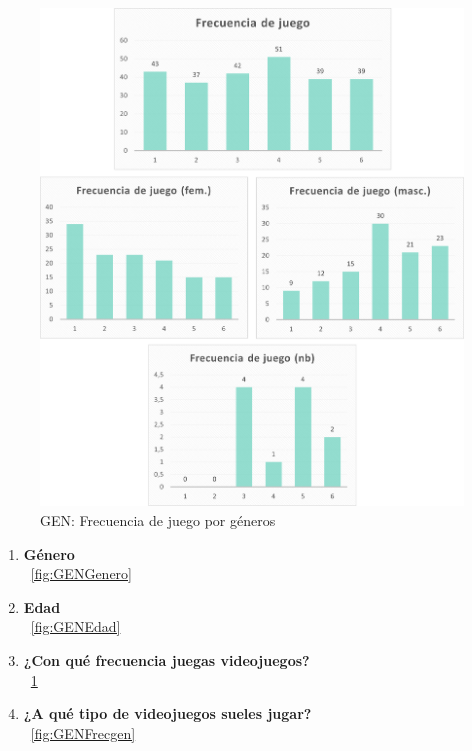 \documentclass[12pt, a4paper,twoside,titlepage]{book}
\begin{document}
\begin{figure}
	\centering
	\includegraphics[width=1\linewidth]{ANEXO Gen/3AnexGENFrecALL}
	\caption{GEN: Frecuencia de juego por géneros}
	\label{fig:GENFrec}
\end{figure}


\begin{enumerate}[label=\textbf{\arabic*}.]
     \item \textbf{Género}\\
    ~\ref{fig:GENGenero}
     \item \textbf{Edad }\\
    ~\ref{fig:GENEdad}
     \item \textbf{¿Con qué frecuencia juegas videojuegos?}\\
    ~\ref{fig:GENFrec}
     \item \textbf{¿A qué tipo de videojuegos sueles jugar? }\\
    ~\ref{fig:GENFrecgen}
\end{enumerate}
\end{document}
